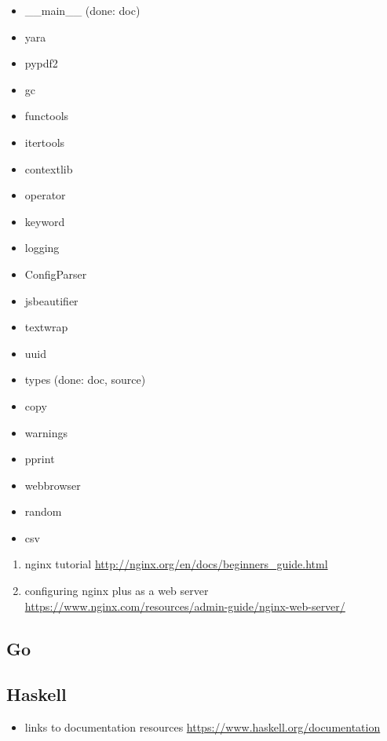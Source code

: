 \documentclass{article}
\begin{document}
\begin{enumerate}
\begin{itemize}
            \item __main__ (done: doc)
            \item yara
            \item pypdf2
            \item gc
            \item functools
            \item itertools
            \item contextlib
            \item operator
            \item keyword
            \item logging
            \item ConfigParser
            \item jsbeautifier
            \item textwrap
            \item uuid
            \item types (done: doc, source)
            \item copy
            \item warnings
            \item pprint
            \item webbrowser
            \item random
            \item csv
        \end{itemize}
        \begin{enumerate}
            \item nginx tutorial \url{http://nginx.org/en/docs/beginners_guide.html}
            \item configuring nginx plus as a web server \url{https://www.nginx.com/resources/admin-guide/nginx-web-server/}
        \end{enumerate}
\end{enumerate}
%
\subsection{Go}
%
\begin{itemize}
\end{itemize}
%
%
\subsection{Haskell}
%
\begin{itemize}
    \item links to documentation resources \url{https://www.haskell.org/documentation}
\end{itemize}
\end{document}
